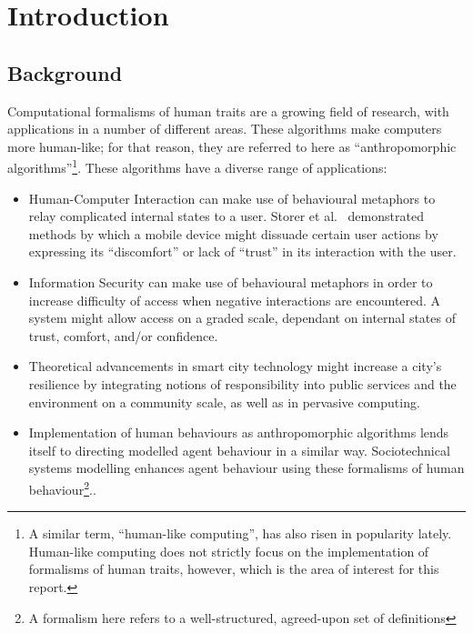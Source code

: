 \section{Introduction}


\subsection{Background}

Computational formalisms of human traits are a growing field of research, with applications in a number of different areas. These algorithms make computers more human-like; for that reason, they are referred to here as ``anthropomorphic algorithms''\footnote{A similar term, ``human-like computing'', has also risen in popularity lately. Human-like computing does not strictly focus on the implementation of formalisms of human traits, however, which is the area of interest for this report.}. These algorithms have a diverse range of applications:

\begin{itemize}
  \item Human-Computer Interaction can make use of behavioural metaphors to relay complicated internal states to a user. Storer et al.~\cite{storer_mobile_behaviour_poster} demonstrated methods by which a mobile device might dissuade certain user actions by expressing its ``discomfort'' or lack of ``trust'' in its interaction with the user.
  \item Information Security can make use of behavioural metaphors in order to increase difficulty of access when negative interactions are encountered. A system might allow access on a graded scale, dependant on internal states of trust, comfort, and/or confidence.
  \item Theoretical advancements in smart city technology might increase a city's resilience by integrating notions of responsibility into public services and the environment on a community scale, as well as in pervasive computing\cite{wallis_talk_about_x_talk}.\par
  \item Implementation of human behaviours as anthropomorphic algorithms lends itself to directing modelled agent behaviour in a similar way. Sociotechnical systems modelling enhances agent behaviour using these formalisms of human behaviour\footnote{A formalism here refers to a well-structured, agreed-upon set of definitions}.\cite{Marsh1994FormalisingConcept}.
\end{itemize}


